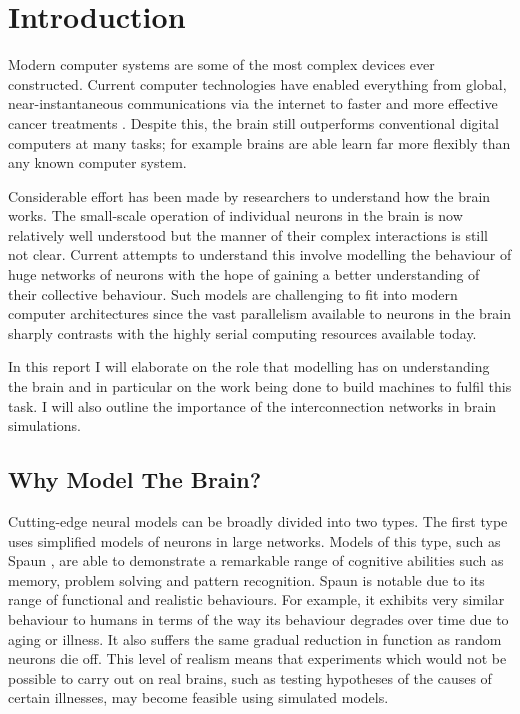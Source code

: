 \chapter{Introduction}
	
	Modern computer systems are some of the most complex devices ever constructed.
	Current computer technologies have enabled everything from global,
	near-instantaneous communications via the internet to faster and more
	effective cancer treatments \cite{nassif}. Despite this, the brain still
	outperforms conventional digital computers at many tasks; for example brains
	are able learn far more flexibly than any known computer system.
	
	Considerable effort has been made by researchers to understand how the brain
	works. The small-scale operation of individual neurons in the brain is now
	relatively well understood but the manner of their complex interactions is
	still not clear. Current attempts to understand this involve modelling the
	behaviour of huge networks of neurons with the hope of gaining a better
	understanding of their collective behaviour. Such models are challenging to
	fit into modern computer architectures since the vast parallelism available to
	neurons in the brain sharply contrasts with the highly serial computing
	resources available today.

	In this report I will elaborate on the role that modelling has on
	understanding the brain and in particular on the work being done to build
	machines to fulfil this task. I will also outline the importance of the
	interconnection networks in brain simulations.
	
	\section{Why Model The Brain?}
	
		Cutting-edge neural models can be broadly divided into two types. The first
		type uses simplified models of neurons in large networks. Models of this
		type, such as Spaun \cite{eliasmith12}, are able to demonstrate a remarkable
		range of cognitive abilities such as memory, problem solving and pattern
		recognition. Spaun is notable due to its range of functional and realistic
		behaviours. For example, it exhibits very similar behaviour to humans in
		terms of the way its behaviour degrades over time due to aging or illness.
		It also suffers the same gradual reduction in function as random neurons die
		off. This level of realism means that experiments which would not be
		possible to carry out on real brains, such as testing hypotheses of the
		causes of certain illnesses, may become feasible using simulated models.
		
